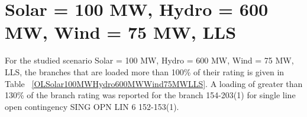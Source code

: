 \documentclass[10pt]{report}
\begin{document}
\section{Solar = 100 MW, Hydro = 600 MW, Wind = 75 MW, LLS}
For the studied scenario Solar = 100 MW, Hydro = 600 MW, Wind = 75 MW, LLS, the branches that are loaded more than 100\% of their rating is given in Table ~\ref{OLSolar100MWHydro600MWWind75MWLLS}. A loading of greater than 130\% of the branch rating was reported for the branch 154-203(1) for single line open contingency SING OPN LIN   6 152-153(1).
\begin{table}[H]
\caption{Contingencies causing branch flow greater than 100\% for scenario Solar = 100 MW, Hydro = 600 MW, Wind = 75 MW, LLS}
\label{OLSolar100MWHydro600MWWind75MWLLS}
\centering
{}
\end{table}
\end{document}
